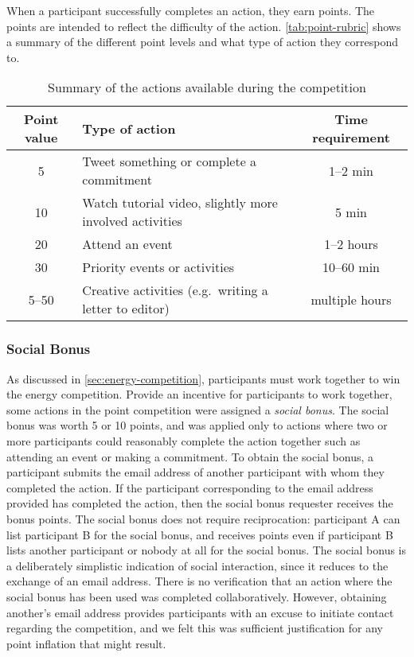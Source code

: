 When a participant successfully completes an action, they earn points. The points are intended to reflect the difficulty of the action. \autoref{tab:point-rubric} shows a summary of the different point levels and what type of action they correspond to.

\begin{table}[htbp]
	\centering
		\begin{tabular}{| c | l | c |}
			\hline
			Point value & Type of action & Time requirement \tabularnewline \hline \hline
			5 & Tweet something or complete a commitment & 1--2 min \\ \hline
			10 & Watch tutorial video, slightly more involved activities & 5 min \\ \hline
			20 & Attend an event & 1--2 hours \\ \hline
			30 & Priority events or activities & 10--60 min \\ \hline
			5--50 & Creative activities (e.g.\ writing a letter to editor) & multiple hours \\ \hline
		\end{tabular}
	\caption{Summary of the actions available during the competition}
\label{tab:point-rubric}
\end{table}


\subsubsection{Social Bonus}

As discussed in \autoref{sec:energy-competition}, participants must work together to win the energy competition. Provide an incentive for participants to work together, some actions in the point competition were assigned a \emph{social bonus}. The social bonus was worth 5 or 10 points, and was applied only to actions where two or more participants could reasonably complete the action together such as attending an event or making a commitment. To obtain the social bonus, a participant submits the email address of another participant with whom they completed the action. If the participant corresponding to the email address provided has completed the action, then the social bonus requester receives the bonus points. The social bonus does not require reciprocation: participant A can list participant B for the social bonus, and receives points even if participant B lists another participant or nobody at all for the social bonus. The social bonus is a deliberately simplistic indication of social interaction, since it reduces to the exchange of an email address. There is no verification that an action where the social bonus has been used was completed collaboratively. However, obtaining another's email address provides participants with an excuse to initiate contact regarding the competition, and we felt this was sufficient justification for any point inflation that might result.



